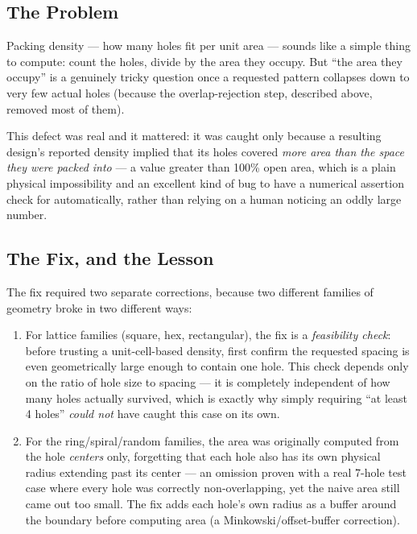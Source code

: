 \subsection{The Problem}

Packing density --- how many holes fit per unit area --- sounds like a
simple thing to compute: count the holes, divide by the area they occupy.
But ``the area they occupy'' is a genuinely tricky question once a
requested pattern collapses down to very few actual holes (because the
overlap-rejection step, described above, removed most of them).

This defect was real and it mattered: it was caught only because a
resulting design's reported density implied that its holes covered
\emph{more area than the space they were packed into} --- a value greater
than 100\% open area, which is a plain physical impossibility and an
excellent kind of bug to have a numerical assertion check for automatically,
rather than relying on a human noticing an oddly large number.

\subsection{The Fix, and the Lesson}

The fix required two separate corrections, because two different families
of geometry broke in two different ways:
\begin{enumerate}
  \item For lattice families (square, hex, rectangular), the fix is a
  \emph{feasibility check}: before trusting a unit-cell-based density, first
  confirm the requested spacing is even geometrically large enough to
  contain one hole. This check depends only on the ratio of hole size to
  spacing --- it is completely independent of how many holes actually
  survived, which is exactly why simply requiring ``at least 4 holes''
  \emph{could not} have caught this case on its own.
  \item For the ring/spiral/random families, the area was originally
  computed from the hole \emph{centers} only, forgetting that each hole
  also has its own physical radius extending past its center --- an
  omission proven with a real 7-hole test case where every hole was
  correctly non-overlapping, yet the naive area still came out too small.
  The fix adds each hole's own radius as a buffer around the boundary
  before computing area (a Minkowski/offset-buffer correction).
\end{enumerate}

